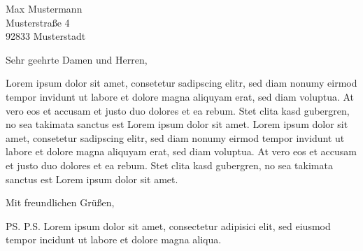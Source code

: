 \documentclass[%
  fontsize=12pt, %
  version=last%
]{scrlttr2}
\begin{document}
 
\begin{letter}{\vspace{-1cm}%

  Max Mustermann\\
  Musterstraße 4\\
  92833 Musterstadt}


\opening{Sehr geehrte Damen und Herren,}

Lorem ipsum dolor sit amet, consetetur sadipscing elitr, sed diam nonumy eirmod tempor invidunt ut labore et dolore magna aliquyam erat, sed diam voluptua. At vero eos et accusam et justo duo dolores et ea rebum. Stet clita kasd gubergren, no sea takimata sanctus est Lorem ipsum dolor sit amet. Lorem ipsum dolor sit amet, consetetur sadipscing elitr, sed diam nonumy eirmod tempor invidunt ut labore et dolore magna aliquyam erat, sed diam voluptua. At vero eos et accusam et justo duo dolores et ea rebum. Stet clita kasd gubergren, no sea takimata sanctus est Lorem ipsum dolor sit amet.

\closing{Mit freundlichen Grüßen,}

\ps{P.S.}
 Lorem ipsum dolor sit amet, consectetur adipisici elit, sed eiusmod tempor incidunt ut labore et dolore magna aliqua.


\end{letter}
\end{document}
